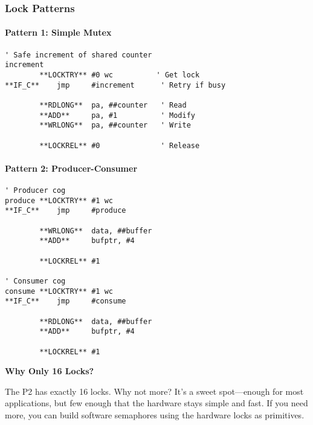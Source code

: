 \documentclass[11pt]{book}
\begin{document}
\hypertarget{lock-patterns}{%
\subsubsection{Lock Patterns}\label{lock-patterns}}

\hypertarget{pattern-1-simple-mutex}{%
\paragraph{Pattern 1: Simple Mutex}\label{pattern-1-simple-mutex}}

\begin{lstlisting}
' Safe increment of shared counter
increment
        **LOCKTRY** #0 wc          ' Get lock
**IF_C**    jmp     #increment      ' Retry if busy
        
        **RDLONG**  pa, ##counter   ' Read
        **ADD**     pa, #1          ' Modify
        **WRLONG**  pa, ##counter   ' Write
        
        **LOCKREL** #0              ' Release
\end{lstlisting}

\hypertarget{pattern-2-producer-consumer}{%
\paragraph{Pattern 2:
Producer-Consumer}\label{pattern-2-producer-consumer}}

\begin{lstlisting}
' Producer cog
produce **LOCKTRY** #1 wc
**IF_C**    jmp     #produce
        
        **WRLONG**  data, ##buffer
        **ADD**     bufptr, #4
        
        **LOCKREL** #1

' Consumer cog  
consume **LOCKTRY** #1 wc
**IF_C**    jmp     #consume
        
        **RDLONG**  data, ##buffer
        **ADD**     bufptr, #4
        
        **LOCKREL** #1
\end{lstlisting}

\begin{sidetrack}
\textbf{Why Only 16 Locks?}

The P2 has exactly 16 locks. Why not more? It's a sweet spot—enough for most applications, but few enough that the hardware stays simple and fast. If you need more, you can build software semaphores using the hardware locks as primitives.
\end{sidetrack}
\end{document}
